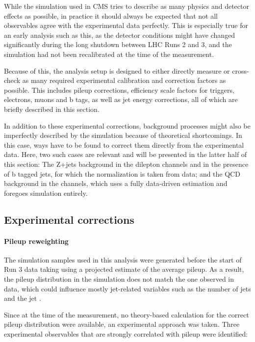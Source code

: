 While the simulation used in CMS tries to describe as many physics and detector effects as possible, in practice it should always be expected that not all observables agree with the experimental data perfectly. This is especially true for an early analysis such as this, as the detector conditions might have changed significantly during the long shutdown between LHC Runs 2 and 3, and the simulation had not been recalibrated at the time of the measurement. 

Because of this, the analysis setup is designed to either directly measure or cross-check as many required experimental calibration and correction factors as possible. This includes pileup corrections, efficiency scale factors for triggers, electrons, muons and b tags, as well as jet energy corrections, all of which are briefly described in this section.

In addition to these experimental corrections, background processes might also be imperfectly described by the simulation because of theoretical shortcomings. In this case, ways have to be found to correct them directly from the experimental data. Here, two such cases are relevant and will be presented in the latter half of this section: The Z+jets background in the dilepton channels and in the presence of b tagged jets, for which the normalization is taken from data; and the QCD background in the \ljets channels, which uses a fully data-driven estimation and foregoes simulation entirely.

\subsection{Experimental corrections}
\label{sec:ttxs:scalefactors}

\paragraph{Pileup reweighting}

The simulation samples used in this analysis were generated before the start of Run 3 data taking using a projected estimate of the average pileup. As a result, the pileup distribution in the simulation does not match the one observed in data, which could influence mostly jet-related variables such as the number of jets and the jet \pt.

Since at the time of the measurement, no theory-based calculation for the correct pileup distribution were available, an experimental approach was taken. Three experimental observables that are strongly correlated with pileup were identified: 

